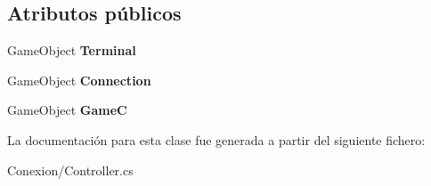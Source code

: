 \subsection*{Atributos públicos}
\begin{DoxyCompactItemize}
\item 
\mbox{\label{class_controller_a51323d3c4ec14f6cb08c5ff78f043294}} 
Game\+Object {\bfseries Terminal}
\item 
\mbox{\label{class_controller_af40ddeff071064e6f098552df3cfd34e}} 
Game\+Object {\bfseries Connection}
\item 
\mbox{\label{class_controller_a1eb5e590212ea6268156999f313bf76c}} 
Game\+Object {\bfseries GameC}
\end{DoxyCompactItemize}


La documentación para esta clase fue generada a partir del siguiente fichero\+:\begin{DoxyCompactItemize}
\item 
Conexion/Controller.\+cs\end{DoxyCompactItemize}

